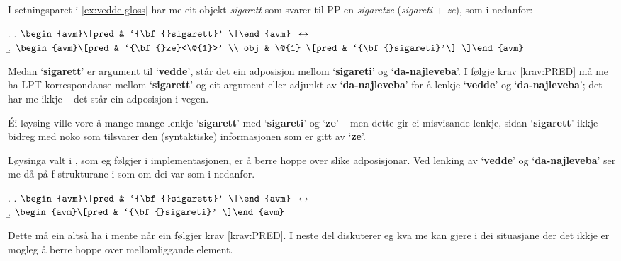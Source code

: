 \documentclass[12pt,a4paper,oneside,draft]{report}
\newcommand{\p}[1]{`\textbf{#1}'}
\begin{document}
\label{SEC:adposisjonsobjekt}

 I setningsparet i \ref{ex:vedde-gloss} har me eit objekt \emph{sigarett}
 som svarer til PP-en \emph{sigaretze} (\emph{sigareti} + \emph{ze}), som i \Next
 nedanfor:

{\avmoptions{}
\ex. \a. $\begin{avm}\[pred & `{\bf{}sigarett}' \]\end{avm}\\$
     $\\\leftrightarrow$\\
     \b.     $\begin{avm}\[pred & `{\bf{}ze}<\@{1}>' \\
                 obj & \@{1} \[pred & `{\bf{}sigareti}'\] \]\end{avm}$

}

 Medan \p{sigarett} er argument til \p{vedde}, står det ein adposisjon
 mellom \p{sigareti} og \p{da-najleveba}. I følgje krav
 \ref{krav:PRED} må me ha LPT\hyp{}korrespondanse mellom \p{sigarett} og
 eit argument eller adjunkt av \p{da-najleveba} for å lenkje \p{vedde} og
 \p{da-najleveba}; det har me ikkje -- det står ein adposisjon i vegen.

 Éi løysing ville vore å mange-mange-lenkje \p{sigarett} med
 \p{sigareti} og \p{ze} -- men dette gir ei misvisande lenkje, sidan
 \p{sigarett} ikkje bidreg med noko som tilsvarer den (syntaktiske)
 informasjonen som er gitt av \p{ze}. 

 Løysinga valt i \citet[s.~75,~fotnote~3]{dyvik2009lmp}, som eg
 følgjer i implementasjonen, er å berre hoppe over slike
 adposisjonar. Ved lenking av \p{vedde} og \p{da-najleveba} ser me
 då på f\hyp{}strukturane i \Last som om dei var som i \Next nedanfor.

{\avmoptions{}
\ex. \a. $\begin{avm}\[pred & `{\bf{}sigarett}' \]\end{avm}\\$
     $\\\leftrightarrow$\\
     \b.     $\begin{avm}\[pred & `{\bf{}sigareti}' \]\end{avm}$

}

 Dette må ein altså ha i mente når ein følgjer krav \ref{krav:PRED}. I
 neste del diskuterer eg kva me kan gjere i dei situasjane der det
 ikkje er mogleg å berre hoppe over mellomliggande element.
\end{document}
